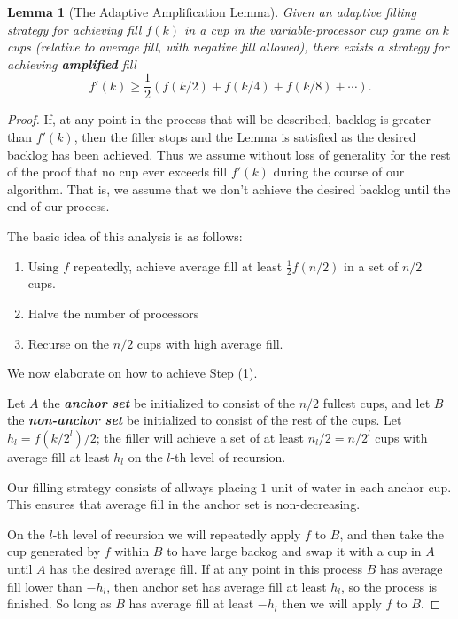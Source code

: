 \documentclass[twocolumn]{article}[11pt]
\newcommand{\defn}[1]{{\textit{\textbf{\boldmath #1}}}}
\newtheorem{lemma}{Lemma}
\begin{document}
\begin{lemma}[The Adaptive Amplification Lemma]
  Given an adaptive filling strategy for achieving fill $f(k)$ in a cup in the
  variable-processor cup game on $k$ cups (relative to average fill, with
  negative fill allowed), there exists a strategy for achieving
  \defn{amplified} fill 
  $$f'(k) \ge \frac{1}{2}(f(k/2) + f(k/4) + f(k/8) + \cdots ).$$
\end{lemma}
\begin{proof}
  If, at any point in the process that will be described, backlog is greater
  than $f'(k)$, then the filler stops and the Lemma is satisfied as the desired
  backlog has been achieved. Thus we assume without loss of generality for
  the rest of the proof that no cup ever exceeds fill $f'(k)$ during the course
  of our algorithm. That is, we assume that we don't achieve the desired
  backlog until the end of our process.

  The basic idea of this analysis is as follows:
  \begin{enumerate}
    \item Using $f$ repeatedly, achieve average fill at least $\frac{1}{2} f(n/2)$ in a set of $n/2$ cups. 
    \item Halve the number of processors
    \item Recurse on the $n/2$ cups with high average fill.
  \end{enumerate}
  We now elaborate on how to achieve Step (1).

  Let $A$ the \defn{anchor set} be initialized to consist of the $n/2$ fullest
  cups, and let $B$ the \defn{non-anchor set} be initialized to consist of the
  rest of the cups.
  Let $h_l = f(k/2^l)/2$; the filler will achieve a set of at
  least $n_l/2 = n/2^l$ cups with average fill at least $h_l$ on the $l$-th
  level of recursion. 

  Our filling strategy consists of allways placing $1$ unit of water in each
  anchor cup. This ensures that average fill in the anchor set is non-decreasing.

  On the $l$-th level of recursion we will repeatedly apply $f$ to
  $B$, and then take the cup generated by $f$ within $B$ to have large backog
  and swap it with a cup in $A$ until $A$ has the desired average fill. If at
  any point in this process $B$ has average fill lower than $-h_l$,
  then anchor set has average fill at least $h_l$, so the process is
  finished. So long as $B$ has average fill at least $-h_l$ then we will
  apply $f$ to $B$.
  

\end{proof}
\end{document}
